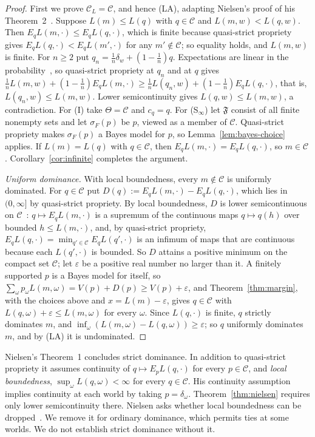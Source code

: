 \documentclass[11pt]{article}
\theoremstyle{definition}
\theoremstyle{remark}
\newcommand{\C}{\mathcal C}
\newcommand{\F}{\mathfrak F}
\begin{document}
\begin{proof}


First we prove $\C_L=\C$, and hence (LA), adapting Nielsen's proof of his Theorem~2~\cite{Nielsen}. Suppose $L(m)\le L(q)$ with $q\in\C$ and $L(m,w)<L(q,w)$. Then $E_qL(m,\cdot)\le E_qL(q,\cdot)$, which is finite because quasi-strict propriety gives $E_qL(q,\cdot)<E_qL(m',\cdot)$ for any $m'\notin\C$; so equality holds, and $L(m,w)$ is finite. For $n\ge2$ put $q_n=\frac1n\delta_w+(1-\frac1n)q$. Expectations are linear in the probability~\cite[Appendix~A, Proposition~1]{Nielsen}, so quasi-strict propriety at $q_n$ and at $q$ gives $\frac1nL(m,w)+(1-\frac1n)E_qL(m,\cdot)\ge\frac1nL(q_n,w)+(1-\frac1n)E_qL(q,\cdot)$, that is, $L(q_n,w)\le L(m,w)$. Lower semicontinuity gives $L(q,w)\le L(m,w)$, a contradiction. For (I) take $\Theta=\C$ and $c_q=q$. For (S$_\infty$) let $\F$ consist of all finite nonempty sets and let $\sigma_F(p)$ be $p$, viewed as a member of $\C$. Quasi-strict propriety makes $\sigma_F(p)$ a Bayes model for $p$, so Lemma~\ref{lem:bayes-choice} applies. If $L(m)=L(q)$ with $q\in\C$, then $E_qL(m,\cdot)=E_qL(q,\cdot)$, so $m\in\C$. Corollary~\ref{cor:infinite} completes the argument.

\emph{Uniform dominance.} With local boundedness, every $m\notin\C$ is uniformly dominated. For $q\in\C$ put $D(q):=E_qL(m,\cdot)-E_qL(q,\cdot)$, which lies in $(0,\infty]$ by quasi-strict propriety. By local boundedness, $D$ is lower semicontinuous on $\C$~\cite[Lemma~3]{Nielsen}: $q\mapsto E_qL(m,\cdot)$ is a supremum of the continuous maps $q\mapsto q(h)$ over bounded $h\le L(m,\cdot)$, and, by quasi-strict propriety, $E_qL(q,\cdot)=\min_{q'\in\C}E_qL(q',\cdot)$ is an infimum of maps that are continuous~\cite[Lemma~1]{Nielsen} because each $L(q',\cdot)$ is bounded. So $D$ attains a positive minimum on the compact set $\C$; let $\varepsilon$ be a positive real number no larger than it. A finitely supported $p$ is a Bayes model for itself, so $\sum_\omega p_\omega L(m,\omega)=V(p)+D(p)\ge V(p)+\varepsilon$, and Theorem~\ref{thm:margin}, with the choices above and $x=L(m)-\varepsilon$, gives $q\in\C$ with $L(q,\omega)+\varepsilon\le L(m,\omega)$ for every $\omega$. Since $L(q,\cdot)$ is finite, $q$ strictly dominates $m$, and $\inf_\omega(L(m,\omega)-L(q,\omega))\ge\varepsilon$; so $q$ uniformly dominates $m$, and by (LA) it is undominated.
\end{proof}

Nielsen's Theorem~1 concludes strict dominance. In addition to quasi-strict propriety it assumes continuity of $q\mapsto E_pL(q,\cdot)$ for every $p\in\C$, and \emph{local boundedness}, $\sup_\omega L(q,\omega)<\infty$ for every $q\in\C$. His continuity assumption implies continuity at each world by taking $p=\delta_\omega$. Theorem~\ref{thm:nielsen} requires only lower semicontinuity there. Nielsen asks whether local boundedness can be dropped~\cite[\S4.2.1]{Nielsen}. We remove it for ordinary dominance, which permits ties at some worlds. We do not establish strict dominance without it.
\end{document}
